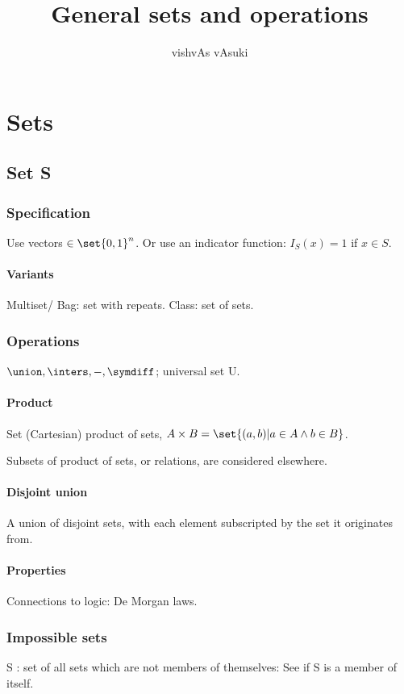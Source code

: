 \documentclass[oneside, article]{memoir}
\title{General sets and operations}
\author{vishvAs vAsuki}
\begin{document}
\maketitle
\tableofcontents

\part{Sets}

\chapter{Set S}
\section{Specification}
Use vectors $\in \set{0,1}^{n}$. Or use an indicator function: $I_{S}(x) = 1$ if $x \in S$.

\subsection{Variants}
Multiset/ Bag: set with repeats. Class: set of sets.

\section{Operations}
$\union, \inters, -, \symdiff$; universal set U.

\subsection{Product}
Set (Cartesian) product of sets, $A \times B = \set{(a, b)| a \in A \land b \in B}$.

Subsets of product of sets, or relations, are considered elsewhere.

\subsection{Disjoint union}
A union of disjoint sets, with each element subscripted by the set it originates from.

\subsection{Properties}
Connections to logic: De Morgan laws.

\section{Impossible sets}
S : set of all sets which are not members of themselves: See if S is a member of itself.
\end{document}
